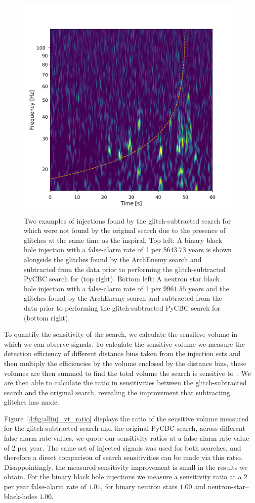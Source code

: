 \begin{figure}
\begin{minipage}[t]{1.0\linewidth}
    \includegraphics[width=0.49\linewidth]{images/4_archenemy/Section4/4.1/NSBH_H1_loud_Subtracted.pdf}
  \end{minipage}
    \caption{Two examples of \gwadj injections found by the glitch-subtracted search for \gws which were not found by the original \gwadj search due to the presence of \scladj glitches at the same time as the \gwadj inspiral. Top left: A binary black hole injection with a false-alarm rate of 1 per $8643.73$ years is shown alongside the \scladj glitches found by the ArchEnemy search and subtracted from the data prior to performing the glitch-subtracted PyCBC search for \gws (top right). Bottom left: A neutron star black hole injection with a false-alarm rate of 1 per $9961.55$ years and the \scladj glitches found by the ArchEnemy search and subtracted from the data prior to performing the glitch-subtracted PyCBC search for \gws (bottom right).}
    \label{4:fig:ae_found}
\end{figure}

To quantify the sensitivity of the search, we calculate the sensitive volume in which we can observe \gwadj signals. To calculate the sensitive volume we measure the detection efficiency of different distance bins taken from the injection sets and then multiply the efficiencies by the volume enclosed by the distance bins, these volumes are then summed to find the total volume the search is sensitive to~\cite{rw_snr_eq:2012}. We are then able to calculate the ratio in sensitivities between the glitch-subtracted \gwadj search and the original \gwadj search,  revealing the improvement that subtracting \scladj glitches has made.

Figure~\ref{4:fig:allinj_vt_ratio} displays the ratio of the sensitive volume measured for the glitch-subtracted \gwadj search and the original PyCBC \gwadj search, across different false-alarm rate values, we quote our sensitivity ratios at a false-alarm rate value of 2 per year. The same set of injected signals was used for both \gwadj searches, and therefore a direct comparison of search sensitivities can be made via this ratio. Disappointingly, the measured sensitivity improvement is small in the results we obtain. For the binary black hole injections we measure a sensitivity ratio at a 2 per year false-alarm rate of $1.01$, for binary neutron stars $1.00$ and neutron-star--black-holes $1.00$. 

